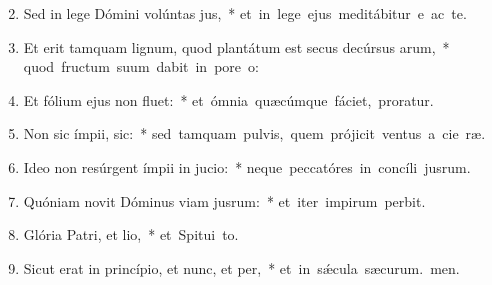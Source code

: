\begin{flushleft}
\begin{enumerate}[leftmargin=*]
\setcounter{enumi}{1}

\item Sed in lege Dómini volúntas jus,~* \mbox{et in lege ejus meditábitur e ac te.}

\item Et erit tamquam lignum, quod plantátum est secus decúrsus arum,~* \mbox{quod fructum suum dabit in pore o:}

\item Et fólium ejus non fluet:~* \mbox{et ómnia quæcúmque fáciet, proratur.}

\item Non sic ímpii,  sic:~* \mbox{sed tamquam pulvis, quem prójicit ventus a cie ræ.}

\item Ideo non resúrgent ímpii in jucio:~* \mbox{neque peccatóres in concíli jusrum.}

\item Quóniam novit Dóminus viam jusrum:~* \mbox{et iter impirum perbit.}

\item Glória Patri, et lio,~* \mbox{et Spitui to.}

\item Sicut erat in princípio, et nunc, et per,~* \mbox{et in s\'{\ae}cula sæcurum. men.}


\end{enumerate}
\end{flushleft}

